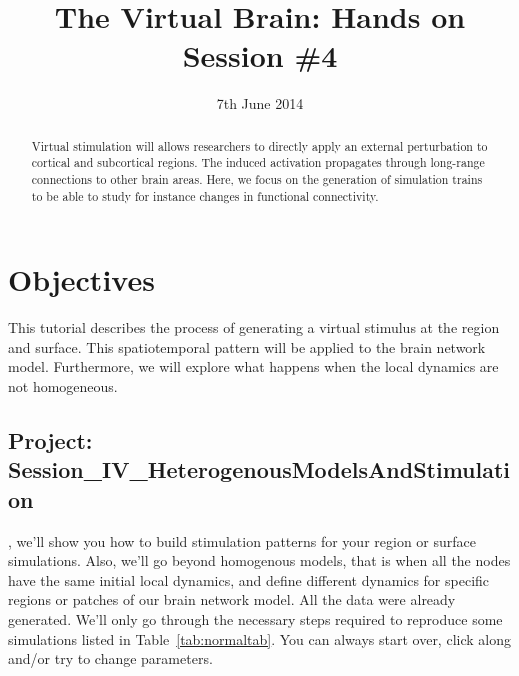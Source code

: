 \documentclass{tufte-handout}
\title{The Virtual Brain: Hands on Session \#4}
\date{7th June 2014}
\begin{document}

\newpage
\ClearWallPaper
\begin{abstract}
\noindent Virtual stimulation will allows researchers to directly apply an external perturbation to cortical and subcortical regions. The induced activation propagates through long-range
connections to other brain areas. Here, we focus on the generation of
simulation trains to be able to study for instance changes in
functional connectivity.  

\begin{marginfigure}%
  \label{fig:marginfig}
\end{marginfigure}
\end{abstract}


\section{Objectives}\label{sec:objectives}

This tutorial describes the process of generating a virtual stimulus at the
region and surface. This spatiotemporal pattern will be applied to the brain network model.
Furthermore, we will explore what happens when the local dynamics are not homogeneous.


\subsection{Project: Session\_IV\_HeterogenousModelsAndStimulation}\label{sec:project_data}

, we'll show you how to build stimulation patterns for your region or surface simulations. Also, we'll go beyond homogenous models, that is when all the nodes have the same initial local dynamics,  and define different dynamics for specific regions or patches of our brain network model. 
All the data were already generated. We'll only go through the necessary steps required to reproduce some simulations listed in Table~\ref{tab:normaltab}. You can always start over, click along and/or try to change parameters.
\end{document}
